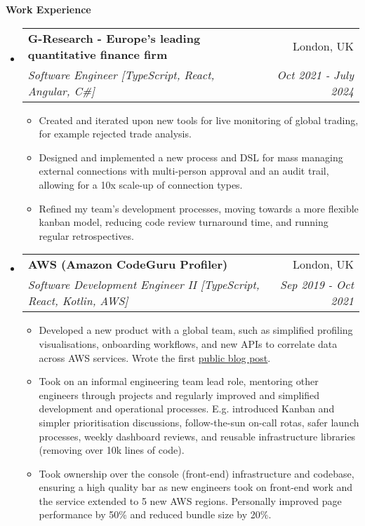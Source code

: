 \documentclass[letterpaper,11pt]{article}
\makeatletter
\newcommand{\resitem}[1]{\item #1 \vspace{-2pt}}
\newcommand{\resheading}[1]{{\large \colorbox{mygrey}{\begin{minipage}{\textwidth}{\textbf{#1 \vphantom{p\^{E}}}}\end{minipage}}}}
\newcommand{\ressubheading}[4]{
\begin{tabular*}{7.0in}{l@{\extracolsep{\fill}}r}
	\textbf{#1} & #2 \\
	\textit{#3} & \textit{#4} \\
\end{tabular*}\vspace{-6pt}}
\makeatother
\begin{document}
	\resheading{Work Experience}
	\begin{itemize}
		\item
		\ressubheading{G-Research - Europe's leading quantitative finance firm}{London, UK}{Software Engineer [TypeScript, React, Angular, C\#]}{Oct 2021 - July 2024}
		\begin{itemize}
			\resitem{Created and iterated upon new tools for live monitoring of global trading, for example rejected trade analysis.}
			\resitem{Designed and implemented a new process and DSL for mass managing external connections with multi-person approval and an audit trail, allowing for a 10x scale-up of connection types.}
			\resitem{Refined my team's development processes, moving towards a more flexible kanban model, reducing code review turnaround time, and running regular retrospectives.}
		\end{itemize}

		\item
		\ressubheading{AWS (Amazon CodeGuru Profiler)}{London, UK}{Software Development Engineer II [TypeScript, React, Kotlin, AWS]}{Sep 2019 - Oct 2021}
		\begin{itemize}
			\resitem{Developed a new product with a global team, such as simplified profiling visualisations, onboarding workflows, and new APIs to correlate data across AWS services. Wrote the first \href{https://aws.amazon.com/blogs/machine-learning/optimizing-application-performance-with-amazon-codeguru-profiler/}{public blog post}.}
			\resitem{Took on an informal engineering team lead role, mentoring other engineers through projects and regularly improved and simplified development and operational processes. E.g. introduced Kanban and simpler prioritisation discussions, follow-the-sun on-call rotas, safer launch processes, weekly dashboard reviews, and reusable infrastructure libraries (removing over 10k lines of code).}
			\resitem{Took ownership over the console (front-end) infrastructure and codebase, ensuring a high quality bar as new engineers took on front-end work and the service extended to 5 new AWS regions. Personally improved page performance by 50\% and reduced bundle size by 20\%.}
		\end{itemize}


\end{itemize}
\end{document}
